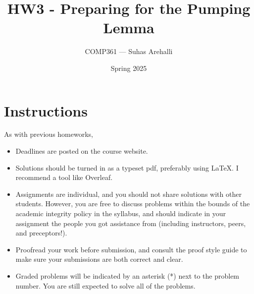 \documentclass{exam}
\title{HW3 - Preparing for the Pumping Lemma}
\author{COMP361 --- Suhas Arehalli}
\date{Spring 2025}
\begin{document}
\maketitle

\section*{Instructions}
As with previous homeworks, 

\begin{itemize}
    \item Deadlines are posted on the course website.
    \item Solutions should be turned in as a typeset pdf, preferably using LaTeX. I recommend a tool like Overleaf. 
    \item Assignments are individual, and you should not share solutions with other students. However, you are free to discuss problems within the bounds of the academic integrity policy in the syllabus, and should indicate in your assignment the people you got assistance from (including instructors, peers, and preceptors!). 
    \item Proofread your work before submission, and consult the proof style guide to make sure your submissions are both correct and clear.
    \item Graded problems will be indicated by an asterisk (*) next to the problem number. You are still expected to solve all of the problems.
\end{itemize}
\end{document}
